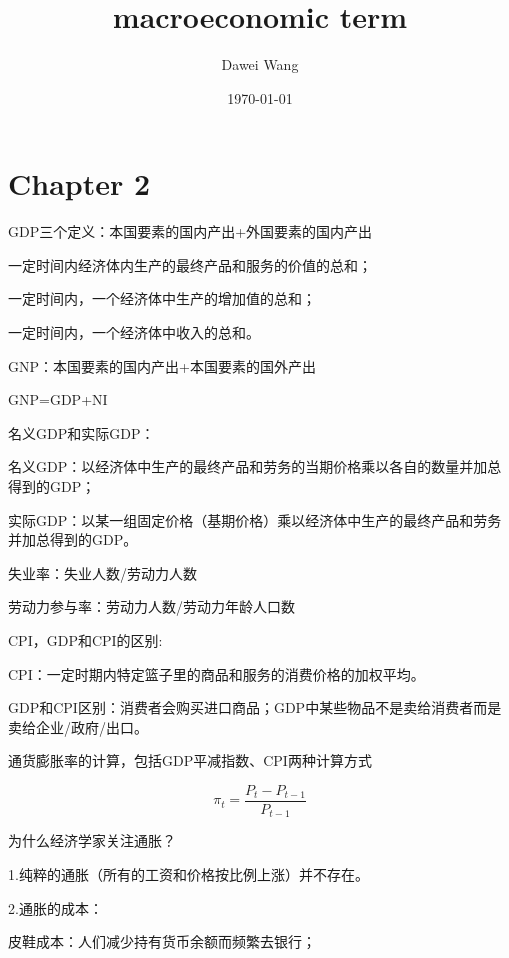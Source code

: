 \documentclass{article}
\title{macroeconomic term}
\author{Dawei Wang}
\date{\today}
\begin{document}
	\maketitle
\section{Chapter 2}
GDP三个定义：本国要素的国内产出+外国要素的国内产出

一定时间内经济体内生产的最终产品和服务的价值的总和；

一定时间内，一个经济体中生产的增加值的总和；

一定时间内，一个经济体中收入的总和。

GNP：本国要素的国内产出+本国要素的国外产出

GNP=GDP+NI

\hspace*{\fill}

名义GDP和实际GDP：

名义GDP：以经济体中生产的最终产品和劳务的当期价格乘以各自的数量并加总得到的GDP；

实际GDP：以某一组固定价格（基期价格）乘以经济体中生产的最终产品和劳务并加总得到的GDP。

\hspace*{\fill}

失业率：失业人数/劳动力人数

\hspace*{\fill}

劳动力参与率：劳动力人数/劳动力年龄人口数

\hspace*{\fill}

CPI，GDP和CPI的区别:

CPI：一定时期内特定篮子里的商品和服务的消费价格的加权平均。

GDP和CPI区别：消费者会购买进口商品；GDP中某些物品不是卖给消费者而是卖给企业/政府/出口。

\hspace*{\fill}

通货膨胀率的计算，包括GDP平减指数、CPI两种计算方式

\[
\pi_t=\frac{P_t-P_{t-1}}{P_{t-1}}
\]

\hspace*{\fill}

为什么经济学家关注通胀？

1.纯粹的通胀（所有的工资和价格按比例上涨）并不存在。

2.通胀的成本：

皮鞋成本：人们减少持有货币余额而频繁去银行；
\end{document}

